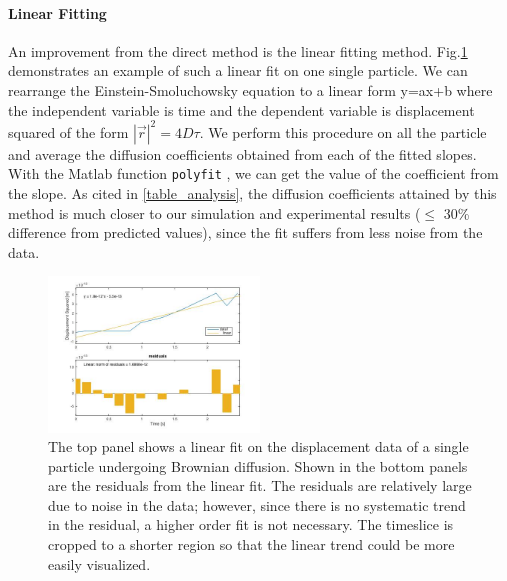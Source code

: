 \documentclass[iop,revtex4]{emulateapj_mod}
\begin{document}
 \paragraph{Linear Fitting}  An improvement from the direct method is the linear fitting method. Fig.\ref{linear_fit} demonstrates an example of such a linear fit on one single particle. We can rearrange the Einstein-Smoluchowsky equation to a linear form y=ax+b where the independent variable is time and the dependent variable is displacement squared of the form $|\vec{r}|^2 = 4D\tau$. We perform this procedure on all the particle and average the diffusion coefficients obtained from  each of the fitted slopes. With the Matlab function \texttt{polyfit} \citep{linear_fit}, we can get the value of the coefficient from the slope. As cited in \ref{table_analysis}, the diffusion coefficients attained by this method is much closer to our simulation and experimental results ($\leq$ 30\% difference from predicted values), since the fit suffers from less noise from the data. 
 \begin{figure}[h]
\includegraphics[width=0.50\textwidth]{plots/linear_fit.jpg}
\caption{The top panel shows a linear fit on the displacement data of a single particle undergoing Brownian diffusion. Shown in the bottom panels are the residuals from the linear fit. The residuals are relatively large due to noise in the data; however, since there is no systematic trend in the residual, a higher order fit is not necessary. The timeslice is cropped to a shorter region so that the linear trend could be more easily visualized.}
\label{linear_fit}
\end{figure}
\end{document}
